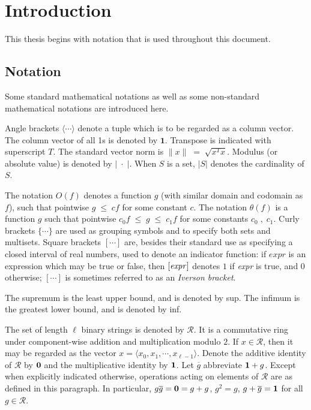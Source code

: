 \chapter{Introduction} \label{ch:introduction}
This thesis begins with notation that is used throughout this document.
\section{Notation}
Some standard mathematical notations as well as some non-standard mathematical notations are introduced here.

Angle brackets $\langle \cdots \rangle$ denote a tuple which is to be regarded as a column
vector. The column vector of all 1s is denoted by $\bm{1}$. Transpose is indicated with superscript $T$. 
The standard vector norm is $\|x\| \;=\; \sqrt{x^T x}$. Modulus (or absolute value) is denoted by $|\; \cdot \;|$. 
When $S$ is a set, $|S|$ denotes the cardinality of $S$.

The notation $O(f)$ denotes a function $g$ (with similar domain and codomain as
$f$), such that pointwise $g \;\leq \;c f$ for some constant $c$. 
The notation $\theta(f)$ is a function $g$ such that pointwise 
$c_0 f \;\leq\; g \;\leq\; c_1 f$ for some constants $c_0 \;,\; c_1$. 
Curly brackets $\{\cdots\}$ are used as grouping symbols and to specify both sets
and multisets. Square brackets $[ \cdots ]$ are, besides their standard use as specifying 
a closed interval of real numbers, used to denote an indicator function:
if $expr$ is an expression which may be true or false, then
$[\mbox{\em expr\/} ]$ denotes $1$ if {\em expr\/} is
true, and $0$ otherwise; $[ \cdots ]$ is sometimes referred to as an {\em Iverson bracket}. 

The supremum is the least upper bound, and is denoted by sup. The infimum
is the greatest lower bound, and is denoted by inf.

The set of length $\ell$ binary strings is denoted by $\mathcal{R}$. It is a
commutative ring under component-wise addition and
multiplication modulo $2$. If $x \in \mathcal{R}$, then it may 
be regarded as the vector $x = \langle x_0, x_1, \cdots, x_{\ell - 1} \rangle$. 
Denote the additive identity of $\mathcal{R}$ by ${\bf 0}$ and the
multiplicative identity by ${\bf 1}$. Let $\overline{g}$
abbreviate ${\bf 1} + g$.  Except when explicitly indicated otherwise,
operations acting on elements of $\mathcal{R}$ are as defined in this
paragraph. In particular, $g \overline{g} = {\bf 0} = g+g$,
  $g^2 = g$, $g + \overline{g} = {\bf 1}$ for all $g \in
  \mathcal{R}$.


